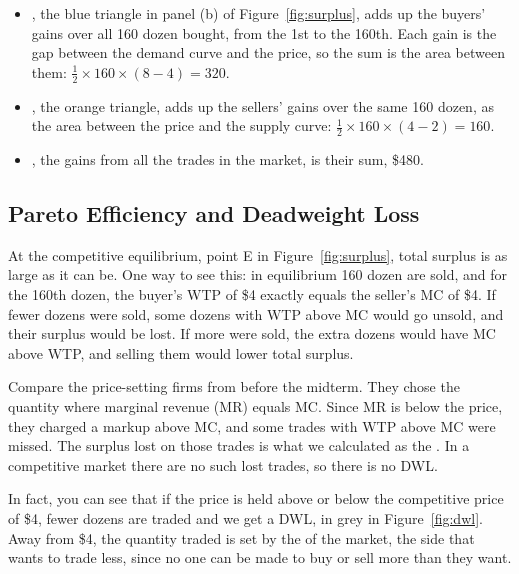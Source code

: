 \documentclass[11pt]{article}
\begin{document}
\begin{itemize}
\item {}, the blue triangle in panel (b) of Figure~\ref{fig:surplus}, adds up the buyers' gains over all 160 dozen bought, from the 1st to the 160th. Each gain is the gap between the demand curve and the price, so the sum is the area between them: $\tfrac{1}{2} \times 160 \times (8 - 4) = 320$.
\item {}, the orange triangle, adds up the sellers' gains over the same 160 dozen, as the area between the price and the supply curve: $\tfrac{1}{2} \times 160 \times (4 - 2) = 160$.
\item {}, the gains from all the trades in the market, is their sum, \$480.
\end{itemize}

\subsection{Pareto Efficiency and Deadweight Loss}\label{sec:pareto}

At the competitive equilibrium, point E in Figure~\ref{fig:surplus}, total surplus is as large as it can be. One way to see this: in equilibrium 160 dozen are sold, and for the 160th dozen, the buyer's WTP of \$4 exactly equals the seller's MC of \$4. If fewer dozens were sold, some dozens with WTP above MC would go unsold, and their surplus would be lost. If more were sold, the extra dozens would have MC above WTP, and selling them would lower total surplus.

Compare the price-setting firms from before the midterm. They chose the quantity where marginal revenue (MR) equals MC. Since MR is below the price, they charged a markup above MC, and some trades with WTP above MC were missed. The surplus lost on those trades is what we calculated as the . In a competitive market there are no such lost trades, so there is no DWL.

In fact, you can see that if the price is held above or below the competitive price of \$4, fewer dozens are traded and we get a DWL, in grey in Figure~\ref{fig:dwl}. Away from \$4, the quantity traded is set by the  of the market, the side that wants to trade less, since no one can be made to buy or sell more than they want.
\end{document}
